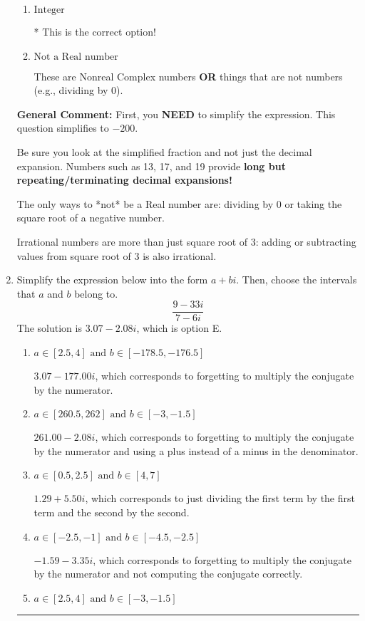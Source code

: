 \documentclass{extbook}[14pt]
\newcommand{\litem}[1]{\item #1

\rule{\textwidth}{0.4pt}}
\begin{document}
\begin{enumerate}
{\begin{enumerate}[label=\Alph*.]
These are numbers that can be written as fraction of Integers (e.g., -2/3)
\item \( \text{Integer} \)

* This is the correct option!
\item \( \text{Not a Real number} \)

These are Nonreal Complex numbers \textbf{OR} things that are not numbers (e.g., dividing by 0).
\end{enumerate}

\textbf{General Comment:} First, you \textbf{NEED} to simplify the expression. This question simplifies to $-200$. 
 
 Be sure you look at the simplified fraction and not just the decimal expansion. Numbers such as 13, 17, and 19 provide \textbf{long but repeating/terminating decimal expansions!} 
 
 The only ways to *not* be a Real number are: dividing by 0 or taking the square root of a negative number. 
 
 Irrational numbers are more than just square root of 3: adding or subtracting values from square root of 3 is also irrational.
}
\litem{
Simplify the expression below into the form $a+bi$. Then, choose the intervals that $a$ and $b$ belong to.
\[ \frac{9 - 33 i}{7 - 6 i} \]
The solution is \( 3.07  - 2.08 i \), which is option E.\begin{enumerate}[label=\Alph*.]
\item \( a \in [2.5, 4] \text{ and } b \in [-178.5, -176.5] \)

 $3.07  - 177.00 i$, which corresponds to forgetting to multiply the conjugate by the numerator.
\item \( a \in [260.5, 262] \text{ and } b \in [-3, -1.5] \)

 $261.00  - 2.08 i$, which corresponds to forgetting to multiply the conjugate by the numerator and using a plus instead of a minus in the denominator.
\item \( a \in [0.5, 2.5] \text{ and } b \in [4, 7] \)

 $1.29  + 5.50 i$, which corresponds to just dividing the first term by the first term and the second by the second.
\item \( a \in [-2.5, -1] \text{ and } b \in [-4.5, -2.5] \)

 $-1.59  - 3.35 i$, which corresponds to forgetting to multiply the conjugate by the numerator and not computing the conjugate correctly.
\item \( a \in [2.5, 4] \text{ and } b \in [-3, -1.5] \)


\end{enumerate}}
\end{enumerate}
\end{document}
